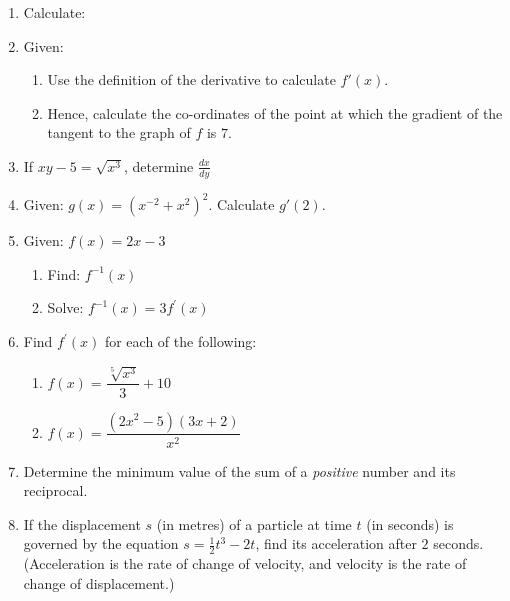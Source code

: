 \begin{enumerate}
\item{Calculate:
}
\item{Given:
\begin{enumerate}
\item{Use the definition of the derivative to calculate $f'(x)$.}
\item{Hence, calculate the co-ordinates of the point at which the gradient of the tangent to the graph of $f$ is $7$.}
\end{enumerate}
}

\item{If $xy-5=\sqrt{x^3}$, determine $\frac{dx}{dy}$}

\item{Given: $g(x)=(x^{-2}+x^2)^2$.
Calculate $g'(2)$.}


\item{Given: $f(x) = 2x - 3$
\begin{enumerate}
\item{Find: $f^{-1}(x)$}
\item{Solve: $f^{-1}(x) = 3f^{\prime}(x)$}
\end{enumerate}}

\item{Find $f^{\prime}(x)$ for each of the following:
\begin{enumerate}
\item{$f(x) = \dfrac{\sqrt[5]{x^3}}{3} + 10$}
\item{$f(x) = \dfrac{(2x^2 - 5)(3x + 2)}{x^2}$}
\end{enumerate}}

\item{Determine the minimum value of the sum of a \textit{positive} number and its reciprocal.}


\item{If the displacement $s$ (in metres) of a particle at time $t$ (in seconds) is governed by the equation $s=\tfrac{1}{2}t^3 - 2t$, find its acceleration after $2$ seconds. (Acceleration is the rate of change of velocity, and velocity is the rate of change of displacement.)}


\end{enumerate}
